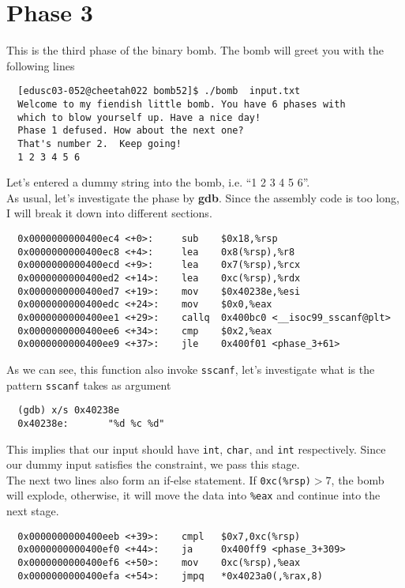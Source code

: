 \section{Phase 3}
This is the third phase of the binary bomb. The bomb will greet you with the following lines
{\renewcommand\fcolorbox[4][]{\textcolor{black}{\strut#4}}
\begin{verbatim}
  [edusc03-052@cheetah022 bomb52]$ ./bomb  input.txt
  Welcome to my fiendish little bomb. You have 6 phases with
  which to blow yourself up. Have a nice day!
  Phase 1 defused. How about the next one?
  That's number 2.  Keep going!
  1 2 3 4 5 6
\end{verbatim}
}\noindent
Let's entered a dummy string into the bomb, i.e. ``1 2 3 4 5 6''.\\
As usual, let's investigate the phase by \textbf{gdb}. Since the assembly code is too long, I will break it down into different sections.
{\renewcommand\fcolorbox[4][]{\textcolor{cyan}{\strut#4}}
\begin{verbatim}
  0x0000000000400ec4 <+0>:     sub    $0x18,%rsp
  0x0000000000400ec8 <+4>:     lea    0x8(%rsp),%r8
  0x0000000000400ecd <+9>:     lea    0x7(%rsp),%rcx
  0x0000000000400ed2 <+14>:    lea    0xc(%rsp),%rdx
  0x0000000000400ed7 <+19>:    mov    $0x40238e,%esi
  0x0000000000400edc <+24>:    mov    $0x0,%eax
  0x0000000000400ee1 <+29>:    callq  0x400bc0 <__isoc99_sscanf@plt>
  0x0000000000400ee6 <+34>:    cmp    $0x2,%eax
  0x0000000000400ee9 <+37>:    jle    0x400f01 <phase_3+61>
\end{verbatim}
}\noindent
As we can see, this function also invoke \verb+sscanf+, let's investigate what is the pattern \verb+sscanf+ takes as argument
{\renewcommand\fcolorbox[4][]{\textcolor{cyan}{\strut#4}}
\begin{verbatim}
  (gdb) x/s 0x40238e
  0x40238e:       "%d %c %d"
\end{verbatim}
}\noindent
This implies that our input should have \verb+int+, \verb+char+, and \verb+int+ respectively. Since our dummy input satisfies the constraint, we pass this stage.\\
The next two lines also form an if-else statement. If \verb+0xc(%rsp)+$ > 7$, the bomb will explode, otherwise, it will move the data into \verb+%eax+ and continue into the next stage.
{\renewcommand\fcolorbox[4][]{\textcolor{cyan}{\strut#4}}
\begin{verbatim}
  0x0000000000400eeb <+39>:    cmpl   $0x7,0xc(%rsp)
  0x0000000000400ef0 <+44>:    ja     0x400ff9 <phase_3+309>
  0x0000000000400ef6 <+50>:    mov    0xc(%rsp),%eax
  0x0000000000400efa <+54>:    jmpq   *0x4023a0(,%rax,8)
\end{verbatim}
}\noindent
